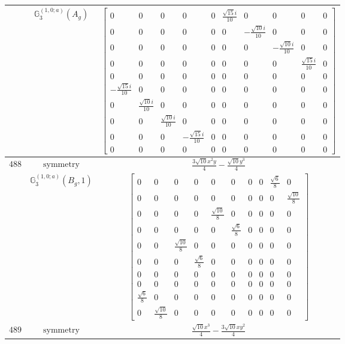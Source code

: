 \documentclass[fleqn,8pt,landscape]{jsarticle}
\begin{document}
\begin{longtable}{ccc}
$  $ & $ \mathbb{G}_{3}^{(1,0;a)}(A_{g}) $ & $ \begin{bmatrix} 0 & 0 & 0 & 0 & 0 & \frac{\sqrt{15} i}{10} & 0 & 0 & 0 & 0 \\ 0 & 0 & 0 & 0 & 0 & 0 & - \frac{\sqrt{10} i}{10} & 0 & 0 & 0 \\ 0 & 0 & 0 & 0 & 0 & 0 & 0 & - \frac{\sqrt{10} i}{10} & 0 & 0 \\ 0 & 0 & 0 & 0 & 0 & 0 & 0 & 0 & \frac{\sqrt{15} i}{10} & 0 \\ 0 & 0 & 0 & 0 & 0 & 0 & 0 & 0 & 0 & 0 \\ - \frac{\sqrt{15} i}{10} & 0 & 0 & 0 & 0 & 0 & 0 & 0 & 0 & 0 \\ 0 & \frac{\sqrt{10} i}{10} & 0 & 0 & 0 & 0 & 0 & 0 & 0 & 0 \\ 0 & 0 & \frac{\sqrt{10} i}{10} & 0 & 0 & 0 & 0 & 0 & 0 & 0 \\ 0 & 0 & 0 & - \frac{\sqrt{15} i}{10} & 0 & 0 & 0 & 0 & 0 & 0 \\ 0 & 0 & 0 & 0 & 0 & 0 & 0 & 0 & 0 & 0 \end{bmatrix} $ \\ \hline
$ 488 $ & $ \text{symmetry} $ & $ \frac{3 \sqrt{10} x^{2} y}{4} - \frac{\sqrt{10} y^{3}}{4} $ \\
$  $ & $ \mathbb{G}_{3}^{(1,0;a)}(B_{g},1) $ & $ \begin{bmatrix} 0 & 0 & 0 & 0 & 0 & 0 & 0 & 0 & \frac{\sqrt{6}}{8} & 0 \\ 0 & 0 & 0 & 0 & 0 & 0 & 0 & 0 & 0 & \frac{\sqrt{10}}{8} \\ 0 & 0 & 0 & 0 & \frac{\sqrt{10}}{8} & 0 & 0 & 0 & 0 & 0 \\ 0 & 0 & 0 & 0 & 0 & \frac{\sqrt{6}}{8} & 0 & 0 & 0 & 0 \\ 0 & 0 & \frac{\sqrt{10}}{8} & 0 & 0 & 0 & 0 & 0 & 0 & 0 \\ 0 & 0 & 0 & \frac{\sqrt{6}}{8} & 0 & 0 & 0 & 0 & 0 & 0 \\ 0 & 0 & 0 & 0 & 0 & 0 & 0 & 0 & 0 & 0 \\ 0 & 0 & 0 & 0 & 0 & 0 & 0 & 0 & 0 & 0 \\ \frac{\sqrt{6}}{8} & 0 & 0 & 0 & 0 & 0 & 0 & 0 & 0 & 0 \\ 0 & \frac{\sqrt{10}}{8} & 0 & 0 & 0 & 0 & 0 & 0 & 0 & 0 \end{bmatrix} $ \\ \hline
$ 489 $ & $ \text{symmetry} $ & $ \frac{\sqrt{10} x^{3}}{4} - \frac{3 \sqrt{10} x y^{2}}{4} $ \\

\end{longtable}
\end{document}
